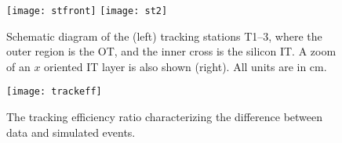 \begin{figure}
  \begin{center}
    \texttt{[image: stfront]}
    \texttt{[image: st2]}
  \end{center}
  \caption[\lhcb tracking stations]
  {\small
      Schematic diagram of the (left) tracking stations T1--3, where the outer region is the OT,
      and the inner cross is the silicon IT.
      A zoom of an $x$ oriented IT layer is also shown (right).
      All units are in cm.
  }
  \label{fig:lhcb:tracking}
\end{figure}


\begin{figure}[h]
  \begin{center}
    \texttt{[image: trackeff]}
  \end{center}
  \caption{
    The tracking efficiency ratio characterizing the difference between data and simulated events.
  }
  \label{fig:trackeff}
\end{figure}

